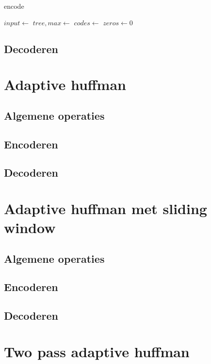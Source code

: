 \documentclass[a4paper,12pt]{report}
\begin{document}
\begin{algorithm}[H]
\caption{encode}
\SetAlgoLined	
\DontPrintSemicolon
$input \gets$\;	
$tree, max \gets$\;
$codes \gets$\;
\;
\;
$zeros \gets 0$\;
\;
\;
\;
\end{algorithm}

\subsection{Decoderen}

\section{Adaptive huffman}
\subsection{Algemene operaties}

\subsection{Encoderen}

\subsection{Decoderen}

\section{Adaptive huffman met sliding window}
\subsection{Algemene operaties}

\subsection{Encoderen}

\subsection{Decoderen}


\section{Two pass adaptive huffman}
\end{document}
